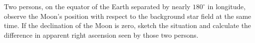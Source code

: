 Two persons, on the equator of the Earth separated by nearly $180^\circ$ in
longitude, observe the Moon's position with respect to the background star
field at the same time. If the declination of the Moon is zero, sketch the
situation and calculate the difference in apparent right ascension seen by
those two persons.
